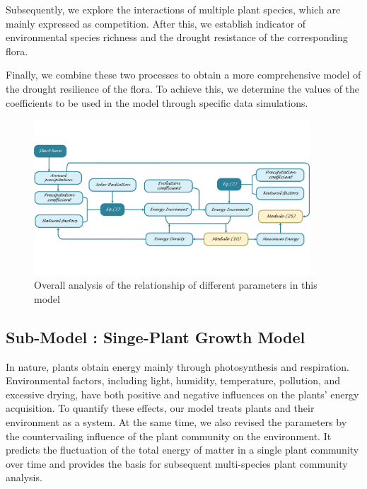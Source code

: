 \documentclass[12pt]{article}  %
\begin{document}
Subsequently, we explore the interactions of multiple plant species, which are mainly expressed as competition. After this, we establish indicator of environmental species  richness and the drought resistance of the corresponding flora.

Finally, we combine these two processes to obtain a more comprehensive model of the drought resilience of the flora. To achieve this, we determine the values of the coefficients to be used in the model through specific data simulations. 

\vspace{-0.2cm}
\begin{figure}[htbp]
	\centering
	\includegraphics[width=0.92\textwidth]{easymcm/img/module.pdf}
	\caption{Overall analysis of the relationship of different parameters in this model}
 \label{fig:work4}
\end{figure}

\vspace{-1cm}
\subsection{Sub-Model \uppercase\expandafter{}: Singe-Plant Growth Model}
\vspace{-0.3cm}
In nature, plants obtain energy mainly through photosynthesis and respiration. Environmental factors, including light, humidity, temperature, pollution, and excessive drying, have both positive and negative influences on the plants' energy acquisition. To quantify these effects, our model treats plants and their environment as a system. At the same time, we also revised the parameters by the countervailing influence of the plant community on the environment. It predicts the fluctuation of the total energy of matter in a single plant community over time and provides the basis for subsequent multi-species plant community analysis.
\end{document}
